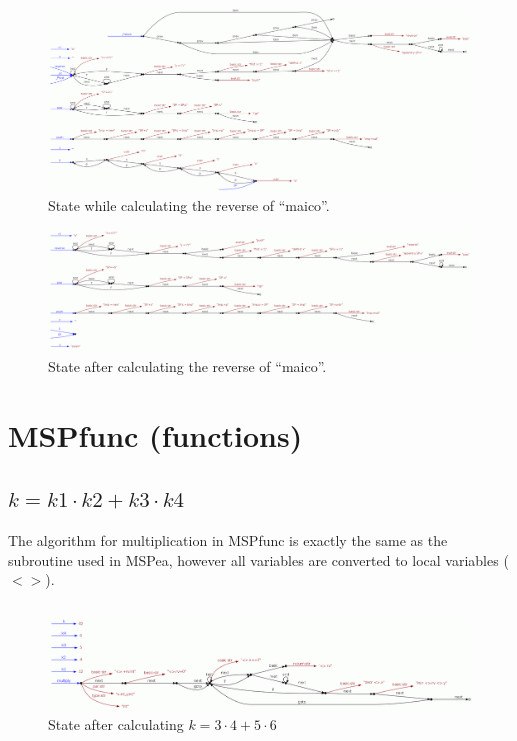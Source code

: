 \documentclass[a4paper,12px]{article}
\begin{document}
\begin{figure}[h]
    \centering
    \includegraphics[width=0.8\linewidth]{reverse2_mspea.png}
    \caption{State while calculating the reverse of ``maico''.}
\end{figure}
\FloatBarrier%
\begin{figure}[h]
    \centering
    \includegraphics[width=0.8\linewidth]{reverse_mspea.png}
    \caption{State after calculating the reverse of ``maico''.}
\end{figure}
\FloatBarrier%



\section{MSPfunc (functions)}
\subsection{$k = k1\cdot k2+k3\cdot k4$}
The algorithm for multiplication in MSPfunc is exactly the same as the subroutine used in MSPea, however all variables are converted to local variables ($<>$).

\inputminted[bgcolor=bg]{C}{mult.mspfunc}

\begin{figure}[h]
    \centering
    \includegraphics[width=\linewidth]{mult_mspfunc.png}
    \caption{State after calculating $k = 3\cdot4 + 5\cdot6$}
\end{figure}
\FloatBarrier%
\end{document}
